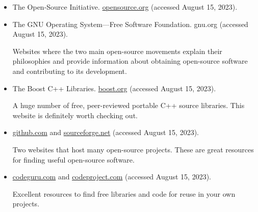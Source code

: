\begin{itemize}
\item
The Open-Source Initiative. \url{opensource.org} (accessed August 15, 2023).

\item
The GNU Operating System—Free Software Foundation. gnu.org (accessed August 15, 2023).

Websites where the two main open-source movements explain their philosophies and provide information about obtaining open-source software and contributing to its development.

\item
The Boost C++ Libraries. \url{boost.org} (accessed August 15, 2023).

A huge number of free, peer-reviewed portable C++ source libraries. This website is definitely worth checking out.

\item
\url{github.com} and \url{sourceforge.net} (accessed August 15, 2023).

Two websites that host many open-source projects. These are great resources for finding useful open-source software.

\item
\url{codeguru.com} and \url{codeproject.com} (accessed August 15, 2023).

Excellent resources to find free libraries and code for reuse in your own projects.
\end{itemize}